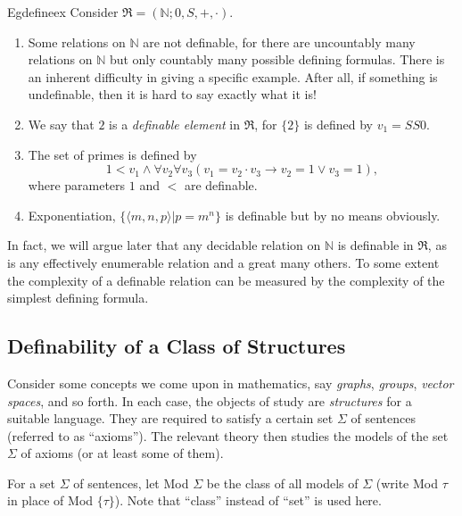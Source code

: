 \begin{reference}{Eg}{defineex}
  Consider $\mathfrak{R}=(\mathbb{N};0,S,+,\cdot).$
  \begin{enumerate}
    \item Some relations on $\mathbb{N}$ are not definable, for there are uncountably many relations on $\mathbb{N}$ but only countably many possible defining formulas. There is an inherent difficulty in giving a specific example. After all, if something is undefinable, then it is hard to say exactly what it is!
    \item We say that $2$ is a \textit{definable element} in $\mathfrak{R}$, for $\{2\}$ is defined by $v_1=SS0.$
    \item The set of primes is defined by
          \[
            1<v_1\wedge\forall v_2\forall v_3(v_1=v_2\cdot v_3\rightarrow v_2=1\vee v_3=1),
          \]
          where parameters $1$ and $<$ are definable.
    \item Exponentiation, $\{\langle m,n,p\rangle|p=m^n\}$ is definable but by no means obviously.\qedhere
  \end{enumerate}
\end{reference}

In fact, we will argue later that any decidable relation on $\mathbb{N}$ is definable in $\mathfrak{R}$, as is any effectively enumerable relation and a great many others. To some extent the complexity of a definable relation can be measured by the complexity of the simplest defining formula.

\subsection*{Definability of a Class of Structures}

Consider some concepts we come upon in mathematics, say \textit{graphs}, \textit{groups}, \textit{vector spaces}, and so forth. In each case, the objects of study are \textit{structures} for a suitable language. They are required to satisfy a certain set $\Sigma$ of sentences (referred to as ``axioms''). The relevant theory then studies the models of the set $\Sigma$ of axioms (or at least some of them).

For a set $\Sigma$ of sentences, let Mod $\Sigma$ be the class of all models of $\Sigma$ (write Mod $\tau$ in place of Mod $\{\tau\}$). Note that ``class'' instead of ``set'' is used here.

